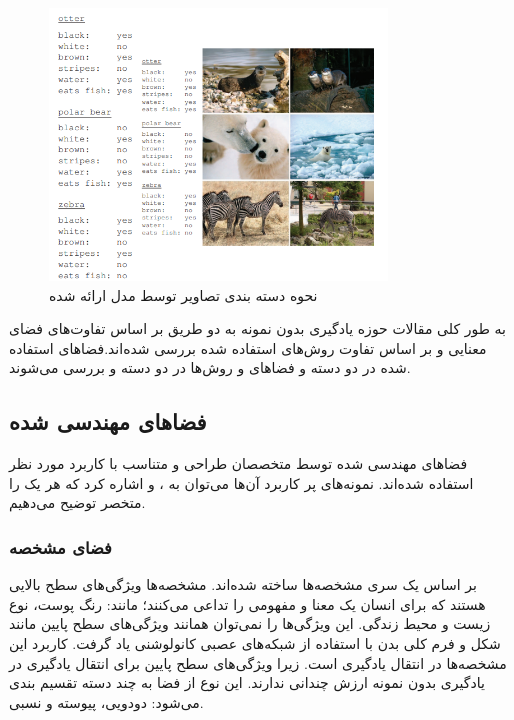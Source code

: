 \begin{figure}[h]
    \centering
    \includegraphics[width=0.8\textwidth]{img/report/sample}
    \caption{نحوه دسته بندی تصاویر توسط مدل ارائه شده\cite{Lampert2014}}
    \label{fig:attribute infromation}
    \centering
\end{figure}


به طور کلی مقالات حوزه یادگیری بدون نمونه به دو طریق بر اساس تفاوت‌های فضای معنایی و بر اساس تفاوت روش‌های استفاده شده بررسی شده‌اند.فضاهای استفاده شده در دو دسته
 و
فضاهای
و روش‌‌ها در دو دسته
 و
بررسی می‌شوند.\cite{Wang2019}

\subsection{فضاهای مهندسی شده}
فضا‌های مهندسی شده توسط متخصصان طراحی و متناسب با کاربرد مورد نظر استفاده شده‌اند. نمونه‌های پر کاربرد آن‌ها می‌توان به
،
 و
اشاره کرد که هر یک را متخصر توضیح می‌دهیم.

\subsubsection{فضای مشخصه}
بر اساس یک سری مشخصه‌ها ساخته شده‌اند. مشخصه‌ها ویژگی‌های سطح بالایی هستند که برای انسان یک معنا و مفهومی را تداعی می‌کنند؛ مانند: رنگ پوست، نوع زیست و محیط زندگی. این ویژگی‌ها را نمی‌توان همانند ویژگی‌های سطح پایین مانند شکل و فرم کلی بدن با استفاده از شبکه‌های عصبی کانولوشنی یاد گرفت. کاربرد این مشخصه‌ها در انتقال یادگیری است. زیرا ویژگی‌های سطح پایین برای انتقال یادگیری در یادگیری بدون نمونه ارزش چندانی ندارند. این نوع از فضا به چند دسته تقسیم بندی می‌شود: دودویی، پیوسته و نسبی.

